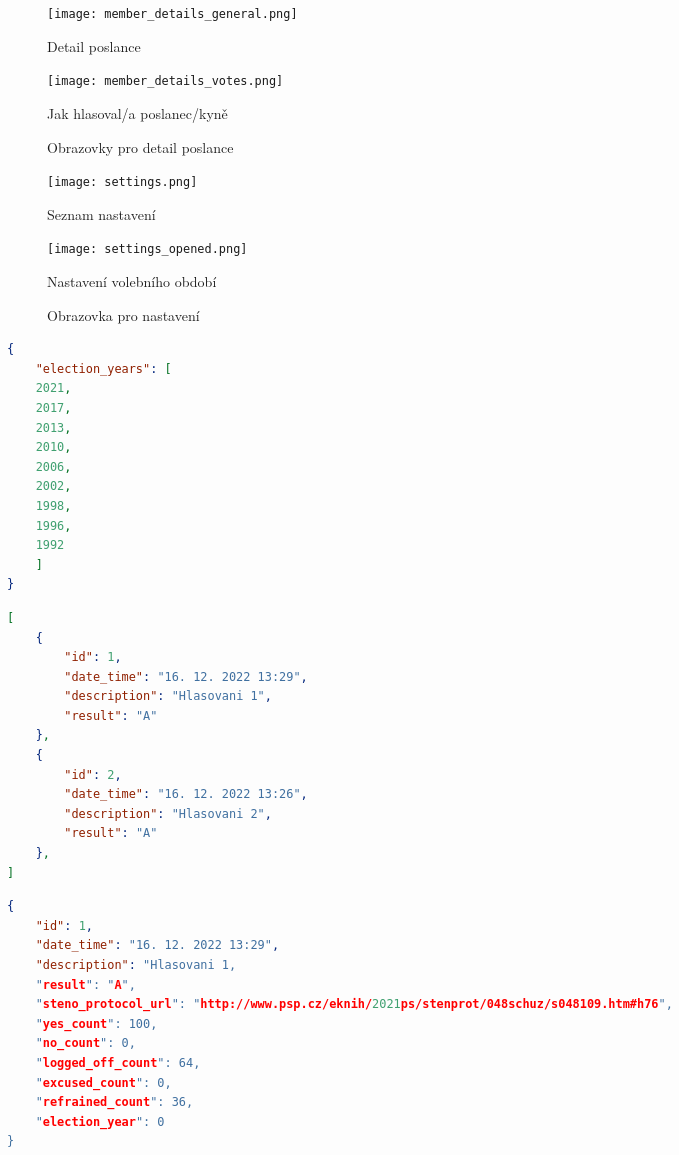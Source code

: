 \begin{figure}[h]
	\begin{minipage}{0.5\textwidth}
		\centering
		\texttt{[image: member\_details\_general.png]}
		\caption{Detail poslance}
		\label{fig:member_details_general}
	\end{minipage}%
	\begin{minipage}{0.5\textwidth}
		\centering
		\texttt{[image: member\_details\_votes.png]}
		\caption{Jak hlasoval/a poslanec/kyně}
		\label{fig:member_details_votes}
	\end{minipage}
	\caption{Obrazovky pro detail poslance}
\end{figure}

\begin{figure}[h]
	\begin{minipage}{0.5\textwidth}
		\centering
		\texttt{[image: settings.png]}
		\caption{Seznam nastavení}
		\label{fig:settings}
	\end{minipage}%
	\begin{minipage}{0.5\textwidth}
		\centering
		\texttt{[image: settings\_opened.png]}
		\caption{Nastavení volebního období}
		\label{fig:settings_opened}
	\end{minipage}
	\caption{Obrazovka pro nastavení}
\end{figure}

\begin{lstlisting}[caption={Tělo odpovědi pro dotaz \lstinline{GET /api/app}.}, label={fig:app}, language=json,firstnumber=1,tabsize=2]
{
	"election_years": [
	2021,
	2017,
	2013,
	2010,
	2006,
	2002,
	1998,
	1996,
	1992
	]
}
\end{lstlisting}

\begin{lstlisting}[caption={Tělo odpovědi pro dotaz \lstinline{GET /api/vote}}, label={fig:vote}, language=json,firstnumber=1,tabsize=2]
[
	{
		"id": 1,
		"date_time": "16. 12. 2022 13:29",
		"description": "Hlasovani 1",
		"result": "A"
	},
	{
		"id": 2,
		"date_time": "16. 12. 2022 13:26",
		"description": "Hlasovani 2",
		"result": "A"
	},
]
\end{lstlisting}

\begin{lstlisting}[caption={Tělo odpovědi pro dotaz \lstinline{GET /api/vote{id}}}, label={fig:vote-1}, language=json,firstnumber=1,tabsize=2]
{
	"id": 1,
	"date_time": "16. 12. 2022 13:29",
	"description": "Hlasovani 1,
	"result": "A",
	"steno_protocol_url": "http://www.psp.cz/eknih/2021ps/stenprot/048schuz/s048109.htm#h76",
	"yes_count": 100,
	"no_count": 0,
	"logged_off_count": 64,
	"excused_count": 0,
	"refrained_count": 36,
	"election_year": 0
}
\end{lstlisting}


